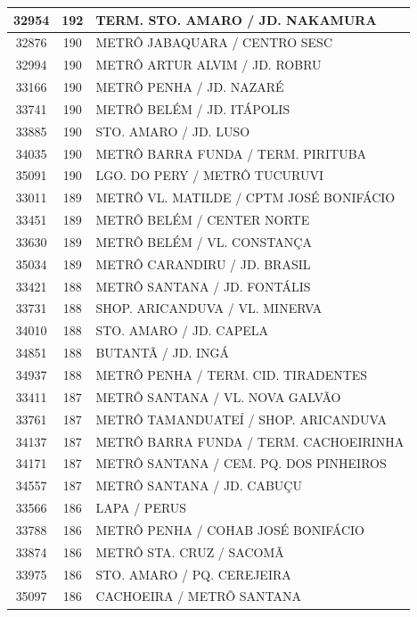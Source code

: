 \documentclass[
	12pt,				%
	oneside,			%
	a4paper,			%
	english,			%
	brazil				%
	]{abntex2ppgsi}
\begin{document}
{{{\begin{apendicesenv}
\begin{longtable}{c|c|p{7cm}}
 \hline 
32954 &	192 &	TERM. STO. AMARO / JD. NAKAMURA \\ 
 \hline 
32876 &	190 &	METRÔ JABAQUARA / CENTRO SESC \\ 
 \hline 
32994 &	190 &	METRÔ ARTUR ALVIM / JD. ROBRU \\ 
 \hline 
33166 &	190 &	METRÔ PENHA / JD. NAZARÉ \\ 
 \hline 
33741 &	190 &	METRÔ BELÉM / JD. ITÁPOLIS \\ 
 \hline 
33885 &	190 &	STO. AMARO / JD. LUSO \\ 
 \hline 
34035 &	190 &	METRÔ BARRA FUNDA / TERM. PIRITUBA \\ 
 \hline 
35091 &	190 &	LGO. DO PERY / METRÔ TUCURUVI \\ 
 \hline 
33011 &	189 &	METRÔ VL. MATILDE / CPTM JOSÉ BONIFÁCIO \\ 
 \hline 
33451 &	189 &	METRÔ BELÉM / CENTER NORTE \\ 
 \hline 
33630 &	189 &	METRÔ BELÉM / VL. CONSTANÇA \\ 
 \hline 
35034 &	189 &	METRÔ CARANDIRU / JD. BRASIL \\ 
 \hline 
33421 &	188 &	METRÔ SANTANA / JD. FONTÁLIS \\ 
 \hline 
33731 &	188 &	SHOP. ARICANDUVA / VL. MINERVA \\ 
 \hline 
34010 &	188 &	STO. AMARO / JD. CAPELA \\ 
 \hline 
34851 &	188 &	BUTANTÃ / JD. INGÁ \\ 
 \hline 
34937 &	188 &	METRÔ PENHA / TERM. CID. TIRADENTES \\ 
 \hline 
33411 &	187 &	METRÔ SANTANA / VL. NOVA GALVÃO \\ 
 \hline 
33761 &	187 &	METRÔ TAMANDUATEÍ / SHOP. ARICANDUVA \\ 
 \hline 
34137 &	187 &	METRÔ BARRA FUNDA / TERM. CACHOEIRINHA \\ 
 \hline 
34171 &	187 &	METRÔ SANTANA / CEM. PQ. DOS PINHEIROS \\ 
 \hline 
34557 &	187 &	METRÔ SANTANA / JD. CABUÇU \\ 
 \hline 
33566 &	186 &	LAPA / PERUS \\ 
 \hline 
33788 &	186 &	METRÔ PENHA / COHAB JOSÉ BONIFÁCIO \\ 
 \hline 
33874 &	186 &	METRÔ STA. CRUZ / SACOMÃ \\ 
 \hline 
33975 &	186 &	STO. AMARO / PQ. CEREJEIRA \\ 
 \hline 
35097 &	186 &	CACHOEIRA / METRÔ SANTANA \\ 

\end{longtable}
\end{apendicesenv}}}}
\end{document}
